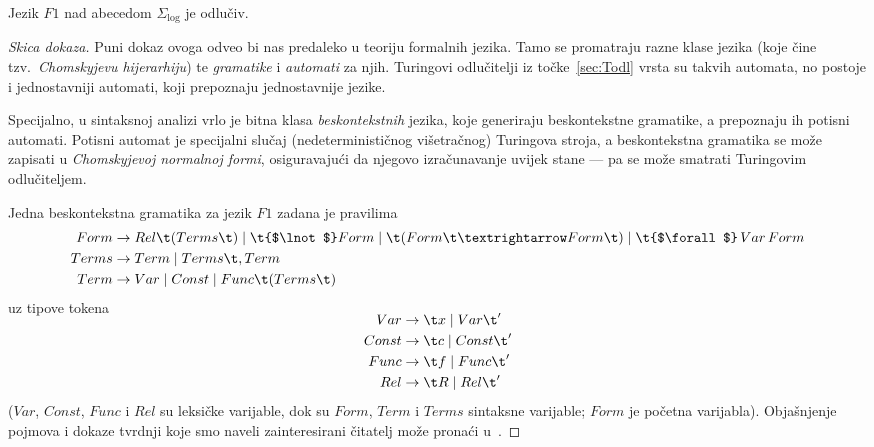 
\begin{propozicija}[{name=[odlučivost jezika svih formula prvog reda]}]\label{pp:F1odl}
    Jezik $F1$ nad abecedom $\Sigma_{\log}$ je odlučiv\!.
\end{propozicija}
\begin{proof}[Skica dokaza] Puni dokaz ovoga odveo bi nas predaleko u teoriju formalnih jezika. Tamo se promatraju razne klase jezika (koje čine tzv\!.\ \emph{Chomskyjevu hijerarhiju}) te \emph{gramatike} i \emph{automati} za njih. Turingovi odlučitelji iz točke~\ref{sec:Todl} vrsta su takvih automata, no postoje i jednostavniji automati, koji prepoznaju jednostavnije jezike.

Specijalno, u sintaksnoj analizi vrlo je bitna klasa \emph{beskontekstnih} jezika, koje generiraju beskontekstne gramatike, a prepoznaju ih potisni automati. Potisni automat je specijalni slučaj (nedeterminističnog višetračnog) Turingova stroja, a beskontekstna gramatika se može zapisati u \emph{Chomskyjevoj normalnoj formi}, osiguravajući da njegovo izračunavanje uvijek stane --- pa se može smatrati Turingovim odlučiteljem.

Jedna beskontekstna gramatika za jezik $F1$ zadana je pravilima
\begin{align}
    Form&\to Rel\t(Terms\t)\mid\t{$\lnot$} Form\mid\t(Form\t\textrightarrow Form\t)\mid\t{$\forall$}\,Var\,Form\\
    Terms&\to Term\mid Terms\t,Term\\
    Term&\to Var\mid Const\mid Func\t(Terms\t)
\end{align}
uz tipove tokena
    \begin{align}
	    \SwapAboveDisplaySkip
    Var&\to\t x\mid Var\t'\\
    Const&\to\t c\mid Const\t'\\
    Func&\to\t f\mid Func\t'\\
    Rel&\to\t R\mid Rel\t'
\end{align}
($Var$, $Const$, $Func$ i $Rel$ su leksičke varijable, dok su $Form$, $Term$ i $Terms$ sintaksne varijable; $Form$ je početna varijabla). Objašnjenje pojmova i dokaze tvrdnji koje smo naveli zainteresirani čitatelj može pronaći u~\cite{sipser}.
\end{proof}

